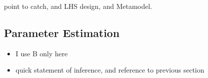 %
%

%
{\color{red}
point to catch, and LHS design, and Metamodel.
}

%
\subsection{Parameter Estimation}
%
\begin{itemize}
	\item I use B only here
	\item quick statement of inference, and reference to previous section
\end{itemize}

